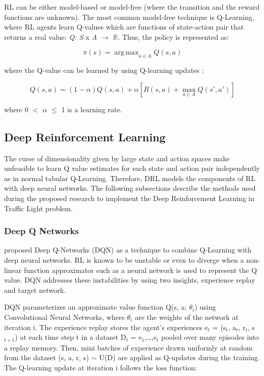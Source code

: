 \documentclass{llncs}
\DeclareMathOperator*{\argmax}{arg\,max}
\begin{document}
RL can be either model-based or model-free (where the transition and the reward functions are unknown). The most common model-free technique is Q-Learning, where RL agents learn Q-values which are functions of state-action pair that returns a real value: \textit{Q: S} x \textit{A $\rightarrow$ $\mathbb{R}$}. Thus, the policy is represented as:

\begin{equation}
\pi(s) = \argmax_{a \in A} Q(s, a)
\end{equation}

where the Q-value can be learned by using Q-learning updates \cite{Watkins1992}:

\begin{equation}
Q(s, a) = (1 - \alpha)Q(s, a) + \alpha[R(s, a) + \max_{a \in A}Q(s', a')]
\end{equation}

where 0 $<$ $\alpha$ $\leq$ 1 is a learning rate.


\subsection{Deep Reinforcement Learning}

The curse of dimensionality given by large state and action spaces make unfeasible to learn Q value estimates for each state and action pair independently as in normal tabular Q-Learning. Therefore, DRL models the components of RL with deep neural networks. The following subsections describe the methods used during the proposed research to implement the Deep Reinforcement Learning in Traffic Light problem.

\subsubsection{Deep Q Networks}

\cite{Mnih2015} proposed Deep Q-Networks (DQN) as a technique to combine Q-Learning with deep neural networks. RL is known to be unstable or even to diverge when a non-linear function approximator such as a neural network is used to represent the Q value. DQN addresses these instabilities by using two insights, experience replay and target network.
	
	DQN parameterizes an approximate value function Q(s, a; $\theta_{i}$) using Convolutional Neural Networks, where $\theta_{i}$ are the weights of the network at iteration i. The experience replay stores the agent's experiences e$_{t}$ = (s$_{t}$, a$_{t}$, r$_{t}$, s$_{t+1}$) at each time step t in a dataset D$_{t}$ = {e$_{1}$,…,e$_{t}$} pooled over many episodes into a replay memory. Then, mini batches of experience drawn uniformly at random from the dataset (s, a, r, s) $\sim$ U(D) are applied as Q-updates during the training. The Q-learning update at iteration i follows the loss function:
	
\end{document}
